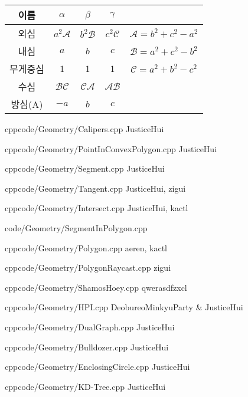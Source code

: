 \documentclass[landscape, 8pt, a4paper, oneside]{extarticle}
\begin{document}
\begin{multicols*}{3}
\begin{tabular}{|c|c|c|c|c|}
    이름 & $\alpha$ & $\beta$ & $\gamma$ & \\ \hline
    외심 & $a^2\mathcal{A}$ & $b^2\mathcal{B}$ & $c^2\mathcal{C}$ & $\mathcal{A}=b^2+c^2-a^2$ \\
    내심 & $a$ & $b$ & $c$ & $\mathcal{B} = a^2 + c^2 - b^2$ \\
    무게중심 & $1$ & $1$ & $1$ & $\mathcal{C} = a^2 + b^2 - c^2$ \\
    수심 & $\mathcal{BC}$ & $\mathcal{CA}$ & $\mathcal{AB}$ & \\
    방심(A) & $-a$ & $b$ & $c$ & 
\end{tabular}

{}{}
{cpp}{code/Geometry/Calipers.cpp}
{JusticeHui}

{}{}
{cpp}{code/Geometry/PointInConvexPolygon.cpp}
{JusticeHui}

{}{}
{cpp}{code/Geometry/Segment.cpp}
{JusticeHui}

{}{}
{cpp}{code/Geometry/Tangent.cpp}
{JusticeHui, zigui}

{}{}
{cpp}{code/Geometry/Intersect.cpp}
{JusticeHui, kactl}

{code/Geometry/SegmentInPolygon.cpp}

{}{}
{cpp}{code/Geometry/Polygon.cpp}
{aeren, kactl}

{}{}
{cpp}{code/Geometry/PolygonRaycast.cpp}
{zigui}

{}{}
{cpp}{code/Geometry/ShamosHoey.cpp}
{qwerasdfzxcl}

{}{}
{cpp}{code/Geometry/HPI.cpp}
{DeobureoMinkyuParty & JusticeHui}

{}{}
{cpp}{code/Geometry/DualGraph.cpp}
{JusticeHui}

{}{}
{cpp}{code/Geometry/Bulldozer.cpp}
{JusticeHui}

{}{}
{cpp}{code/Geometry/EnclosingCircle.cpp}
{JusticeHui}

{}{}
{cpp}{code/Geometry/KD-Tree.cpp}
{JusticeHui}


\end{multicols*}
\end{document}
